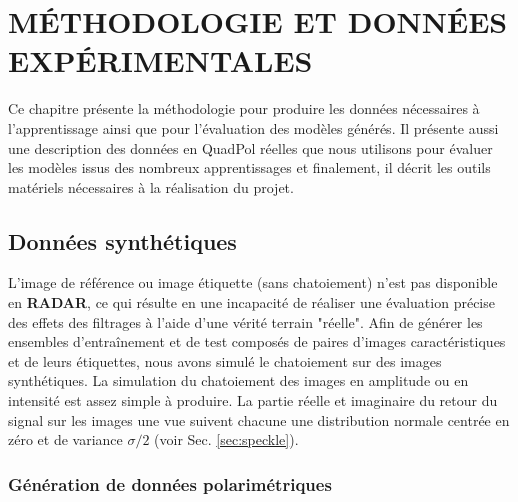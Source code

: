 \chapter{MÉTHODOLOGIE ET DONNÉES EXPÉRIMENTALES}

Ce chapitre présente la méthodologie pour produire les données nécessaires à l'apprentissage ainsi que pour l'évaluation des modèles générés.  Il présente aussi une description des données en QuadPol réelles que nous utilisons pour évaluer les modèles issus des nombreux apprentissages et finalement, il décrit les outils matériels nécessaires à la réalisation du projet.

\section{Données synthétiques}

 L’image de référence ou image étiquette (sans chatoiement) n'est pas disponible en \textbf{RADAR}, ce qui résulte en une incapacité de réaliser une évaluation précise des effets des filtrages à l'aide d'une vérité terrain "réelle".  Afin de générer les ensembles d'entraînement et de test composés de paires d'images caractéristiques et de leurs étiquettes,  nous avons simulé le chatoiement sur des images synthétiques. La simulation du chatoiement des images  \acrsar en amplitude ou en intensité est assez simple à produire.  La partie réelle et imaginaire du retour du signal \acrsar sur les images une vue suivent chacune une  distribution  normale centrée en zéro et de variance $\sigma/2$ (voir Sec. \ref{sec:speckle}).
 
\subsection{Génération de données polarimétriques} \label{sec:cholesky}

